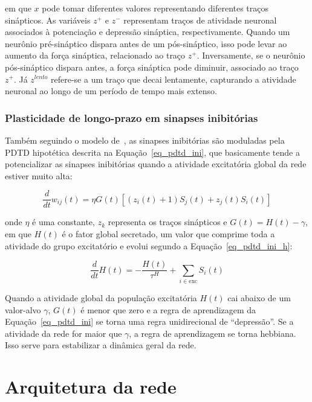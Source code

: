 \noindent{}em que $x$ pode tomar diferentes valores representando diferentes traços sinápticos. As variáveis $z^+$ e $z^-$
representam traços de atividade neuronal associados à potenciação e depressão sináptica, respectivamente. Quando um neurônio
pré-sináptico dispara antes de um pós-sináptico, isso pode levar ao aumento da força sináptica, relacionado ao traço $z^+$.
Inversamente, se o neurônio pós-sináptico dispara antes, a força sináptica pode diminuir, associado ao traço $z^+$. Já $z^{lento}$
refere-se a um traço que decai lentamente, capturando a atividade neuronal ao longo de um período de tempo mais extenso.

\subsubsection{Plasticidade de longo-prazo em sinapses inibitórias}

Também seguindo o modelo de~, as sinapses inibitórias são moduladas pela PDTD hipotética descrita na
Equação~\ref{eq_pdtd_ini}, que basicamente tende a potencializar as sinapses inibitórias quando a atividade excitatória global da
rede estiver muito alta: 

\begin{equation}
\label{eq_pdtd_ini}
\frac{d}{dt}w_{ij}(t) = \eta G(t) [(z_i(t) + 1) S_j(t) + z_j(t) S_i(t)]
\end{equation}

\noindent{}onde $\eta$ é uma constante, $z_k$ representa os traços sinápticos e $G(t) = H(t) - \gamma$, em que $H(t)$ é o fator
global secretado, um valor que comprime toda a atividade do grupo excitatório e evolui segundo a Equação~\ref{eq_pdtd_ini_h}:

\begin{equation}
\label{eq_pdtd_ini_h}
\frac{d}{dt}H(t) = - \frac{H(t)}{\tau^H} + \sum_{i \in \text{exc}} S_i(t)
\end{equation}

Quando a atividade global da população excitatória $H(t)$ cai abaixo de um valor-alvo $\gamma$, $G(t)$ é menor que zero e a regra
de aprendizagem da Equação~\ref{eq_pdtd_ini} se torna uma regra unidirecional de ``depressão''. Se a atividade da rede for maior que
$\gamma$, a regra de aprendizagem se torna hebbiana. Isso serve para estabilizar a dinâmica geral da rede.

\section{Arquitetura da rede}

